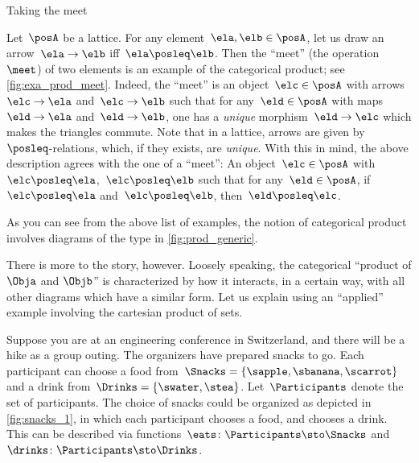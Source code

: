 \begin{marginfigure}
	\centering
	\caption{Taking the meet}
	\label{fig:exa_prod_meet}
\end{marginfigure}

\begin{example}
	\label{exa:meet-as-prod}
	Let~$\posA$ be a lattice.
	For any element~$\ela, \elb \in \posA$, let us draw an arrow~$\ela \to \elb$ iff~$\ela \posleq \elb$.
	Then the ``meet'' (the operation~$\meet$) of two elements is an example of the categorical product; see \cref{fig:exa_prod_meet}.
	Indeed, the ``meet'' is an object~$\elc \in \posA$ with arrows~$\elc\to \ela$ and~$\elc \to \elb$ such that for any~$\eld\in \posA$ with maps~$\eld\to \ela$ and~$\eld\to \elb$, one has a \emph{unique} morphism~$\eld\to \elc$ which makes the triangles commute.
	Note that in a lattice, arrows are given by~$\posleq$-relations, which, if they exists, are \emph{unique}.
	With this in mind, the above description agrees with the one of a ``meet'':
	An object~$\elc\in \posA$ with $\elc\posleq \ela$,~$\elc\posleq \elb$ such that for any~$\eld\in \posA$, if~$\elc\posleq \ela$ and~$\elc\posleq \elb$, then~$\eld\posleq \elc$.
\end{example}

\begin{marginfigure}
	\centering
	\caption{}
	\label{fig:prod_generic}
\end{marginfigure}

As you can see from the above list of examples, the notion of categorical product involves diagrams of the type in \cref{fig:prod_generic}.

There is more to the story, however.
Loosely speaking, the categorical ``product of $\Obja$ and $\Objb$'' is characterized by how it interacts, in a certain way, with all other diagrams which have a similar form.
Let us explain using an ``applied'' example involving the cartesian product of sets.

Suppose you are at an engineering conference in Switzerland, and there will be a hike as a group outing.
The organizers have prepared snacks to go.
Each participant can choose a food from~$\Snacks=\{\sapple,\sbanana,\scarrot\}$ and a drink from~$\Drinks=\{\swater,\stea\}$.
Let~$\Participants$ denote the set of participants.
The choice of snacks could be organized as depicted in \cref{fig:snacks_1}, in which each participant chooses a food, and chooses a drink.
This can be described via functions~$\eats \colon \Participants \sto \Snacks$ and~$\drinks \colon  \Participants \sto \Drinks$.

